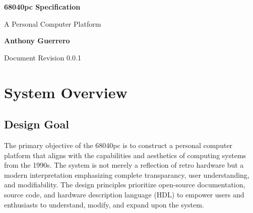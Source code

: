\documentclass{article}
\newcommand{\systemname}[0]{68040pc\xspace}
\begin{document}
\begin{titlepage}
	\begin{center}
		\vspace*{1cm}

		\Huge
		\textbf{\systemname Specification}

		\vspace{0.5cm}
		\LARGE
		A Personal Computer Platform

		\vspace{1.5cm}
		\textbf{Anthony Guerrero}

		\vfill

		\normalsize
		Document Revision 0.0.1

		\vspace{0.8cm}
	\end{center}
\end{titlepage}

\section{System Overview}

\subsection{Design Goal}
The primary objective of the \systemname is to construct a personal computer
platform that aligns with the capabilities and aesthetics of computing systems
from the 1990s. The system is not merely a reflection of retro hardware but a
modern interpretation emphasizing complete transparancy, user understanding,
and modifiability. The design principles prioritize open-source documentation,
source code, and hardware description language (HDL) to empower users and
enthusiasts to understand, modify, and expand upon the system.
\end{document}
